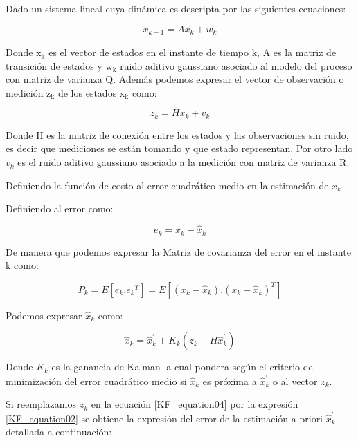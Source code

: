 \documentclass[10pt,a4paper]{article}
\begin{document}
	Dado un sistema lineal cuya dinámica es descripta por las siguientes ecuaciones:
	
	\begin{equation}
		x_{k+1}= Ax_{k} + w_{k}
		\label{KF_equation01}
	\end{equation}	
	
    \noindent Donde $\mathrm{x_{k}}$ es el vector de estados en el instante de 
    tiempo k, A es la matriz de transición de estados y $\mathrm{w_{k}}$ ruido 
    aditivo gaussiano asociado al modelo del proceso con matriz de varianza Q. 
    Además podemos expresar el vector de observación o medición $\mathrm{z_{k}}$ 
    de los estados $\mathrm{x_{k}}$ como:
	
	\begin{equation}
		z_{k}= Hx_{k} + v_{k}
		\label{KF_equation02}
	\end{equation}	
	
	Donde H es la matriz de conexión entre los estados y las observaciones sin ruido, es decir que mediciones se están tomando y que estado representan. Por otro lado $v_{k}$ es el ruido aditivo gaussiano asociado a la medición con matriz de varianza R.
	
	Definiendo la función de costo al error cuadrático medio en la estimación de $x_k$ 
	
	Definiendo al error como: 
	
	\begin{equation}
		e_{k} = x_k  - \hat{x}_k
		\label{KF_error}
	\end{equation}	
	
	De manera que podemos expresar la Matriz de covarianza del error en el instante k como:
	
	\begin{equation}
		P_{k} = E[e_k.{e_k}^{T}] = E[(x_k-\hat{x}_k).(x_k-\hat{x}_k)^{T}]
		\label{KF_equation03}
	\end{equation}	
	
	Podemos expresar $\hat{x}_k$ como: 
	
	\begin{equation}
		\hat{x}_k = \hat{x}^\prime_k + K_k (z_k - H\hat{x}^\prime_k)
		\label{KF_equation04}
	\end{equation}	
	
	Donde $K_k$ es la ganancia de Kalman la cual pondera según el criterio de minimización del error cuadrático medio si $\hat{x}_k$ es próxima a $\hat{x}^\prime_k$ o al vector $z_k$.
	
	Si reemplazamos $z_k$ en la ecuación \ref{KF_equation04} por la expresión \ref{KF_equation02} se obtiene la expresión del error de la estimación a priori $\hat{x}^\prime_k$ detallada a continuación:
	
\end{document}

